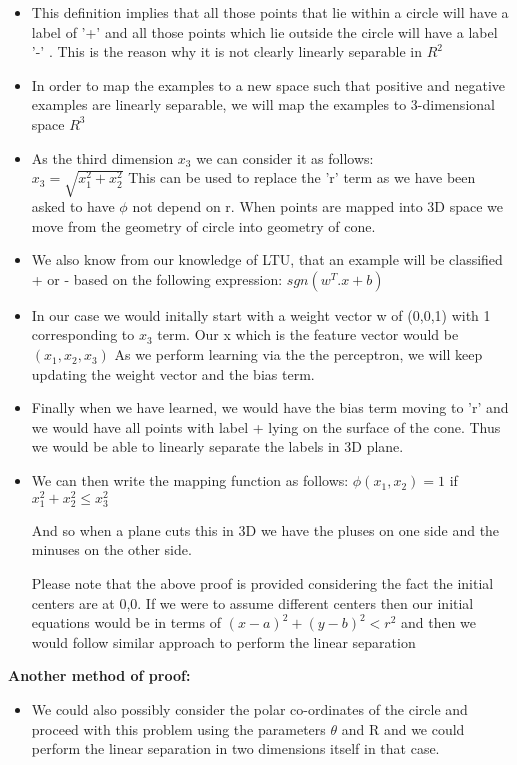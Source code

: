 \documentclass[12pt, fullpage,letterpaper]{article}
\begin{document}
\begin{itemize}
	
\item This definition implies that all those points that lie within a circle will have a label of '+' and all those points which lie outside the circle will have a label '-' . This is the reason why it is not clearly linearly separable in $R^2$ 

\item In order to map the examples to a new space such that positive and negative examples are linearly separable, we will map the examples to 3-dimensional space $R^3$

\item As the third dimension $x_3$ we can consider it as follows: \\
$x_3 =\sqrt{x_1^2 + x_2^2}$ 
This can be used to replace the 'r' term as we have been asked to have $\phi$ not depend on r. When points are mapped into 3D space we move from the geometry of circle into geometry of cone. 

\item We also know from our knowledge of LTU, that an example will be classified + or - based on the following expression:
$sgn(w^T.x +b)$

\item In our case we would initally start with a weight vector w of (0,0,1) with 1 corresponding to $x_3$ term. Our x which is the feature vector would be $(x_1,x_2,x_3)$ As we perform learning via the the perceptron, we will keep updating the weight vector and the bias term. 

\item Finally when we have learned, we would have the bias term moving to 'r' and we would have all points with label + lying on the surface of the cone. Thus we would be able to linearly separate the labels in 3D plane.

\item We can then write the mapping function as follows:
$\phi(x_1,x_2) = 1  $ if  $x_1^2 +x_2^2 \leq x_3^2$ 

 And so when a plane cuts this in 3D we have the pluses on one side and the minuses on the other side. 

Please note that the above proof is provided considering the fact the initial centers are at 0,0. If we were to assume different centers then our initial equations would be in terms of $(x-a)^2 + (y-b)^2 < r^2$ and then we would follow similar approach to perform the linear separation

\end{itemize}
\textbf{Another method of proof:}\\
\begin{itemize}
	
\item We could also possibly consider the polar co-ordinates of the circle and proceed with this problem using the parameters $\theta $ and R and we could perform the linear separation in two dimensions itself in that case.
\end{itemize}
\end{document}
